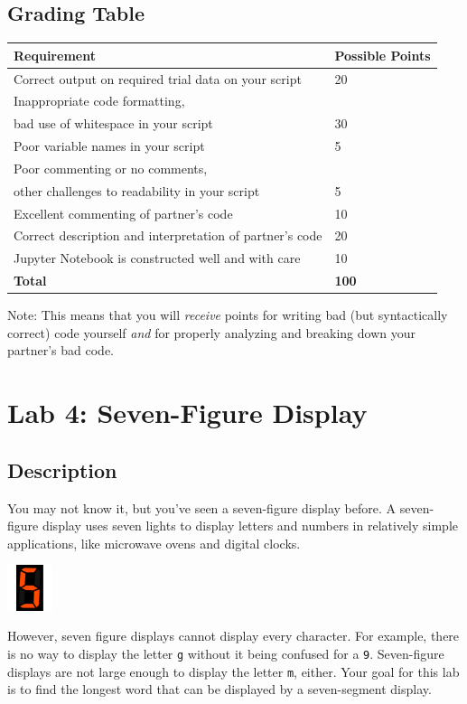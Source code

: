 \subsection*{Grading Table}
\begin{tabular}{|l|l|}
\hline
    Requirement & Possible Points \\ \hline
    Correct output on required trial data on your script & 20 \\ \hline
    Inappropriate code formatting,\\bad use of whitespace in your script & 30 \\ \hline
    Poor variable names in your script & 5 \\ \hline
    Poor commenting or no comments,\\other challenges to readability in your script & 5 \\ \hline
    Excellent commenting of partner's code & 10 \\ \hline
    Correct description and interpretation of partner's code & 20 \\ \hline
    Jupyter Notebook is constructed well and with care & 10 \\
    \hline
    \textbf{Total} & \textbf{100} \\ \hline
\end{tabular}

Note: This means that you will \textit{receive} points for writing bad (but syntactically correct) code yourself \textit{and} for properly analyzing and breaking down your partner's bad code.

\section*{Lab 4: Seven-Figure Display}
\subsection*{Description}
You may not know it, but you've seen a seven-figure display before. A seven-figure display uses seven lights to display letters and numbers in relatively simple applications, like microwave ovens and digital clocks.

\includegraphics[width=0.1\textwidth]{img/7Segment5.png}

However, seven figure displays cannot display every character. For example, there is no way to display the letter \verb|g| without it being confused for a \verb|9|. Seven-figure displays are not large enough to display the letter \verb|m|, either. Your goal for this lab is to find the longest word that can be displayed by a seven-segment display.
